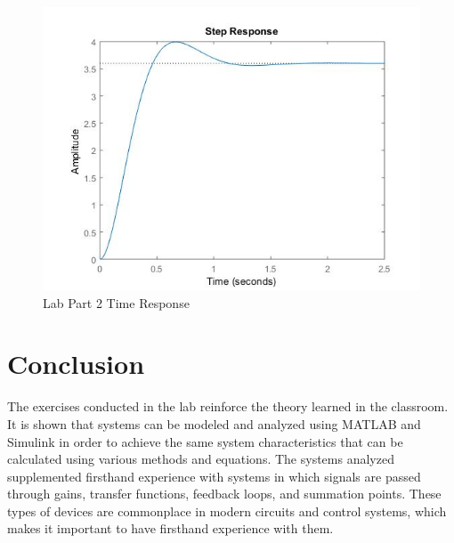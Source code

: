 \documentclass[12pt]{article}
\begin{document}
\newpage

\begin{figure}[h!] %
   \centering
   \includegraphics[width=\linewidth]{part_2_time_response.jpg} 
   \caption{Lab Part 2 Time Response}
   \label{fig:example}
\end{figure}
\bigskip



\section*{\fontsize{12}{12}\selectfont \large Conclusion}
The exercises conducted in the lab reinforce the theory learned in the classroom. It is shown that systems can be modeled and analyzed using MATLAB and Simulink in order to achieve the same system characteristics that can be calculated using various methods and equations. The systems analyzed supplemented firsthand experience with systems in which signals are passed through gains, transfer functions, feedback loops, and summation points. These types of devices are commonplace in modern circuits and control systems, which makes it important to have firsthand experience with them.



\end{document}
